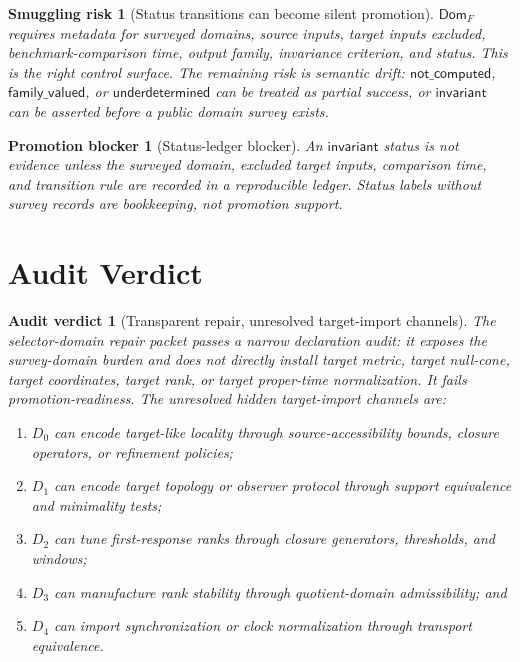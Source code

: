 \documentclass[11pt]{article}
\newcommand{\Dom}{\mathsf{Dom}}
\newtheorem{smugglingrisk}{Smuggling risk}
\newtheorem{promotionblocker}{Promotion blocker}
\newtheorem{auditverdict}{Audit verdict}
\begin{document}
\begin{smugglingrisk}[Status transitions can become silent promotion]
\(\Dom_F\) requires metadata for surveyed domains, source inputs, target
inputs excluded, benchmark-comparison time, output family, invariance
criterion, and status. This is the right control surface. The remaining risk
is semantic drift: \(\mathsf{not\_computed}\),
\(\mathsf{family\_valued}\), or \(\mathsf{underdetermined}\) can be treated
as partial success, or \(\mathsf{invariant}\) can be asserted before a public
domain survey exists.
\end{smugglingrisk}

\begin{promotionblocker}[Status-ledger blocker]
An \(\mathsf{invariant}\) status is not evidence unless the surveyed domain,
excluded target inputs, comparison time, and transition rule are recorded in a
reproducible ledger. Status labels without survey records are bookkeeping,
not promotion support.
\end{promotionblocker}

\section{Audit Verdict}

\begin{auditverdict}[Transparent repair, unresolved target-import channels]
The selector-domain repair packet passes a narrow declaration audit: it
exposes the survey-domain burden and does not directly install target metric,
target null-cone, target coordinates, target rank, or target proper-time
normalization. It fails promotion-readiness. The unresolved hidden
target-import channels are:
\begin{enumerate}
    \item \(D_0\) can encode target-like locality through source-accessibility
    bounds, closure operators, or refinement policies;
    \item \(D_1\) can encode target topology or observer protocol through
    support equivalence and minimality tests;
    \item \(D_2\) can tune first-response ranks through closure generators,
    thresholds, and windows;
    \item \(D_3\) can manufacture rank stability through quotient-domain
    admissibility; and
    \item \(D_4\) can import synchronization or clock normalization through
    transport equivalence.
\end{enumerate}
\end{auditverdict}
\end{document}
